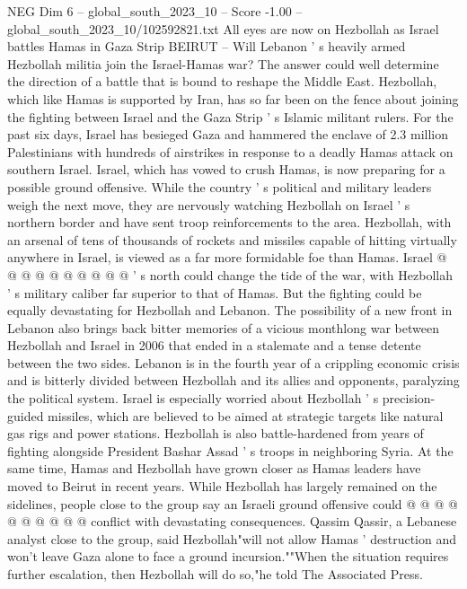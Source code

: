 \begin{textsample}{NEG Dim 6 – global\_south\_2023\_10 – Score -1.00 – global\_south\_2023\_10/102592821.txt}  \label{ex:f6_neg_150}
All eyes are now on Hezbollah as Israel battles Hamas in Gaza Strip BEIRUT -- Will Lebanon ' s heavily armed Hezbollah militia join the Israel-Hamas war?
The answer could well determine the direction of a battle that is bound to reshape the Middle East.
Hezbollah, which like Hamas is supported by Iran, has so far been on the fence about joining the fighting between Israel and the Gaza Strip ' s Islamic militant rulers.
For the past six days, Israel has besieged Gaza and hammered the enclave of 2.3 million Palestinians with hundreds of airstrikes in response to a deadly Hamas attack on southern Israel.
Israel, which has vowed to crush Hamas, is now preparing for a possible ground offensive.
While the country ' s political and military leaders weigh the next move, they are nervously watching Hezbollah on Israel ' s northern border and have sent troop reinforcements to the area.
Hezbollah, with an arsenal of tens of thousands of rockets and missiles capable of hitting virtually anywhere in Israel, is viewed as a far more formidable foe than Hamas.
Israel @ @ @ @ @ @ @ @ @ @ ' s north could change the tide of the war, with Hezbollah ' s military caliber far superior to that of Hamas.
But the fighting could be equally devastating for Hezbollah and Lebanon.
The possibility of a new front in Lebanon also brings back bitter memories of a vicious monthlong war between Hezbollah and Israel in 2006 that ended in a stalemate and a tense detente between the two sides.
Lebanon is in the fourth year of a crippling economic crisis and is bitterly divided between Hezbollah and its allies and opponents, paralyzing the political system.
Israel is especially worried about Hezbollah ' s precision-guided missiles, which are believed to be aimed at strategic targets like natural gas rigs and power stations.
Hezbollah is also battle-hardened from years of fighting alongside President Bashar Assad ' s troops in neighboring Syria.
At the same time, Hamas and Hezbollah have grown closer as Hamas leaders have moved to Beirut in recent years.
While Hezbollah has largely remained on the sidelines, people close to the group say an Israeli ground offensive could @ @ @ @ @ @ @ @ @ @ conflict with devastating consequences.
Qassim Qassir, a Lebanese analyst close to the group, said Hezbollah"will not allow Hamas ' destruction and won't leave Gaza alone to face a ground incursion.""When the situation requires further escalation, then Hezbollah will do so,"he told The Associated Press.

\end{textsample}
